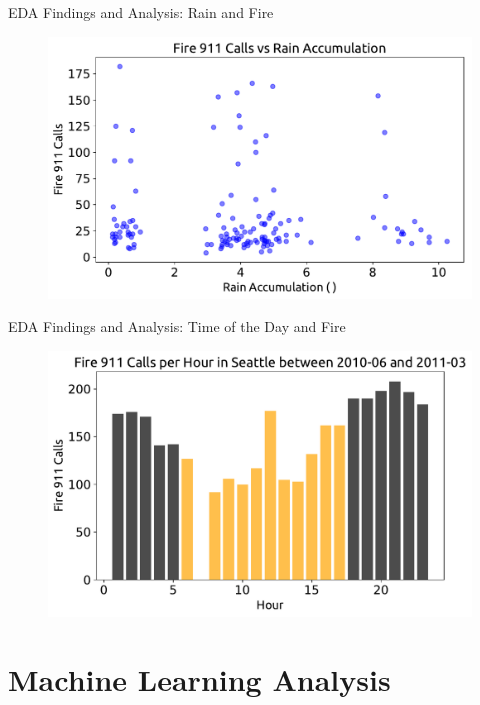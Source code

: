 \documentclass[t,11pt,compress,xcolor=table,hyperref={bookmarks=false}]{beamer}
\begin{document}
\begin{frame}{EDA Findings and Analysis: Rain and Fire}
\begin{figure}[ht!]
\centering
\includegraphics[scale=0.5]{figs/NoCor.pdf}
\end{figure}
\end{frame}

\begin{frame}{EDA Findings and Analysis: Time of the Day and Fire}
\begin{figure}[ht!]
\centering
\includegraphics[scale=0.5]{figs/TimeOfTheDay.pdf}
\end{figure}
\end{frame}

\section{Machine Learning Analysis}
\end{document}
